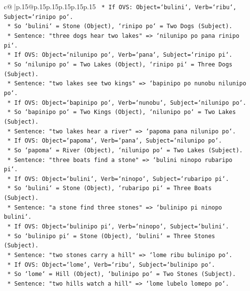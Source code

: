 \documentclass{article}
\begin{document}
{\begin{supertabular}{c@{$\;$}|p{.15\linewidth}@{}p{.15\linewidth}p{.15\linewidth}p{.15\linewidth}p{.15\linewidth}p{.15\linewidth}}
{{{\texttt{        *   If OVS: Object=`bulini`, Verb=`ribu`, Subject=`rinipo po`.} \\
\texttt{        *   So `bulini` = Stone (Object), `rinipo po` = Two Dogs (Subject).} \\
\texttt{    *   Sentence: "three dogs hear two lakes" => `nilunipo po pana rinipo pi`.} \\
\texttt{        *   If OVS: Object=`nilunipo po`, Verb=`pana`, Subject=`rinipo pi`.} \\
\texttt{        *   So `nilunipo po` = Two Lakes (Object), `rinipo pi` = Three Dogs (Subject).} \\
\texttt{    *   Sentence: "two lakes see two kings" => `bapinipo po nunobu nilunipo po`.} \\
\texttt{        *   If OVS: Object=`bapinipo po`, Verb=`nunobu`, Subject=`nilunipo po`.} \\
\texttt{        *   So `bapinipo po` = Two Kings (Object), `nilunipo po` = Two Lakes (Subject).} \\
\texttt{    *   Sentence: "two lakes hear a river" => `papoma pana nilunipo po`.} \\
\texttt{        *   If OVS: Object=`papoma`, Verb=`pana`, Subject=`nilunipo po`.} \\
\texttt{        *   So `papoma` = River (Object), `nilunipo po` = Two Lakes (Subject).} \\
\texttt{    *   Sentence: "three boats find a stone" => `bulini ninopo rubaripo pi`.} \\
\texttt{        *   If OVS: Object=`bulini`, Verb=`ninopo`, Subject=`rubaripo pi`.} \\
\texttt{        *   So `bulini` = Stone (Object), `rubaripo pi` = Three Boats (Subject).} \\
\texttt{    *   Sentence: "a stone find three stones" => `bulinipo pi ninopo bulini`.} \\
\texttt{        *   If OVS: Object=`bulinipo pi`, Verb=`ninopo`, Subject=`bulini`.} \\
\texttt{        *   So `bulinipo pi` = Stone (Object), `bulini` = Three Stones (Subject).} \\
\texttt{    *   Sentence: "two stones carry a hill" => `lome ribu bulinipo po`.} \\
\texttt{        *   If OVS: Object=`lome`, Verb=`ribu`, Subject=`bulinipo po`.} \\
\texttt{        *   So `lome` = Hill (Object), `bulinipo po` = Two Stones (Subject).} \\
\texttt{    *   Sentence: "two hills watch a hill" => `lome lubelo lomepo po`.} \\
}}}
\end{supertabular}}
\end{document}
